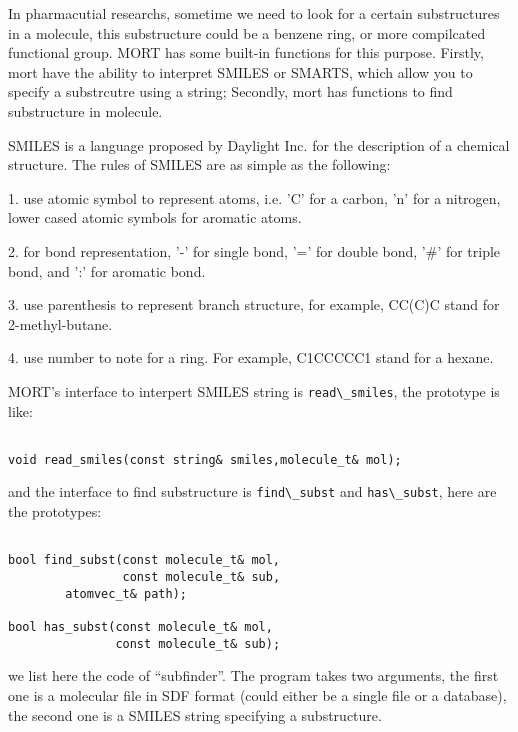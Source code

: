 \documentclass[letterpaper]{book}
\begin{document}
  In pharmacutial researchs, sometime we need to look for a certain substructures in a molecule, 
this substructure could be a benzene ring, or more compilcated functional group. MORT has some
built-in functions for this purpose. Firstly, mort have the ability to interpret SMILES or SMARTS,
which allow you to specify a substrcutre using a string; Secondly, mort has functions to find 
substructure in molecule. 


  SMILES is a language proposed by Daylight Inc. for the description of a chemical
structure. The rules of SMILES are as simple as the following:


   1. use atomic symbol to represent atoms, i.e. 'C' for a carbon, 'n' for a nitrogen,
lower cased atomic symbols for aromatic atoms.


   2. for bond representation, '-' for single bond, '=' for double bond, '\#' for triple
bond, and ':' for aromatic bond.


   3. use parenthesis to represent branch structure, for example, CC(C)C stand for 
2-methyl-butane.


   4. use number to note for a ring. For example, C1CCCCC1 stand for a hexane.


  MORT's interface to interpert SMILES string is \lstinline$read\_smiles$, the prototype is like:

\begin{lstlisting}

void read_smiles(const string& smiles,molecule_t& mol);

\end{lstlisting}

and the interface to find substructure is \lstinline$find\_subst$ and \lstinline$has\_subst$, here are
the prototypes:

\begin{lstlisting}

bool find_subst(const molecule_t& mol, 
                const molecule_t& sub,
		atomvec_t& path);

bool has_subst(const molecule_t& mol,
               const molecule_t& sub);

\end{lstlisting}

we list here the code of ``subfinder''. The program takes two arguments, the first one is a molecular
file in SDF format (could either be a single file or a database), the second one is a SMILES string specifying
a substructure.
\end{document}

